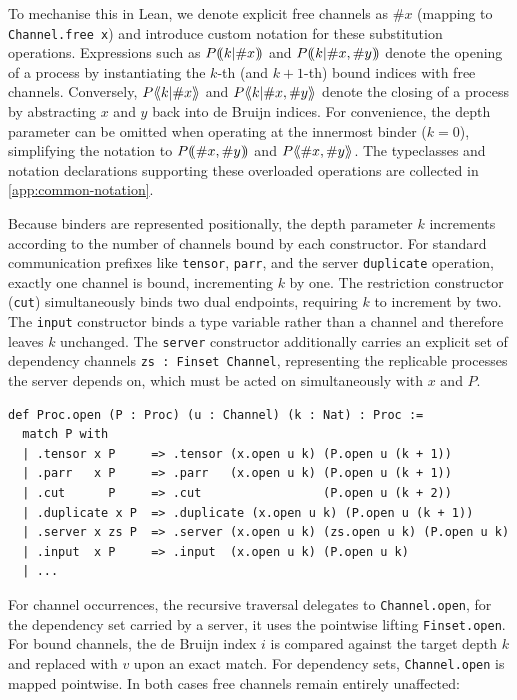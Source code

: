 To mechanise this in Lean, we denote explicit free channels as $\#x$ (mapping to \texttt{Channel.free x}) and introduce custom notation for these substitution operations. Expressions such as $P\lparen\mkern-4mu\lparen k | \#x\rparen\mkern-4mu\rparen$ and $P\lparen\mkern-4mu\lparen k | \#x,\#y\rparen\mkern-4mu\rparen$ denote the opening of a process by instantiating the $k$-th (and $k+1$-th) bound indices with free channels. Conversely, $P\langle\mkern-4mu\langle k | \#x\rangle\mkern-4mu\rangle$ and $P\langle\mkern-4mu\langle k | \#x, \#y\rangle\mkern-4mu\rangle$ denote the closing of a process by abstracting $x$ and $y$ back into de Bruijn indices. For convenience, the depth parameter can be omitted when operating at the innermost binder ($k=0$), simplifying the notation to $P\lparen\mkern-4mu\lparen\#x,\#y\rparen\mkern-4mu\rparen$ and $P\langle\mkern-4mu\langle\#x,\#y\rangle\mkern-4mu\rangle$. The typeclasses and notation declarations supporting these overloaded operations are collected in \cref{app:common-notation}.

Because binders are represented positionally, the depth parameter $k$ increments according to the number of channels bound by each constructor. For standard communication prefixes like \texttt{tensor}, \texttt{parr}, and the server \texttt{duplicate} operation, exactly one channel is bound, incrementing $k$ by one. The restriction constructor (\texttt{cut}) simultaneously binds two dual endpoints, requiring $k$ to increment by two. The \texttt{input} constructor binds a type variable rather than a channel and therefore leaves $k$ unchanged. The \texttt{server} constructor additionally carries an explicit set of dependency channels \texttt{zs~: Finset Channel}, representing the replicable processes the server depends on, which must be acted on simultaneously with $x$ and $P$.

\begin{lstlisting}[language=Lean4]
def Proc.open (P : Proc) (u : Channel) (k : Nat) : Proc :=
  match P with
  | .tensor x P     => .tensor (x.open u k) (P.open u (k + 1))  
  | .parr   x P     => .parr   (x.open u k) (P.open u (k + 1))  
  | .cut      P     => .cut                 (P.open u (k + 2))
  | .duplicate x P  => .duplicate (x.open u k) (P.open u (k + 1))
  | .server x zs P  => .server (x.open u k) (zs.open u k) (P.open u k)
  | .input  x P     => .input  (x.open u k) (P.open u k)
  | ...
\end{lstlisting}

For channel occurrences, the recursive traversal delegates to \texttt{Channel.open}, for the dependency set carried by a server, it uses the pointwise lifting \texttt{Finset.open}. For bound channels, the de Bruijn index $i$ is compared against the target depth $k$ and replaced with $v$ upon an exact match. For dependency sets, \texttt{Channel.open} is mapped pointwise. In both cases free channels remain entirely unaffected:

